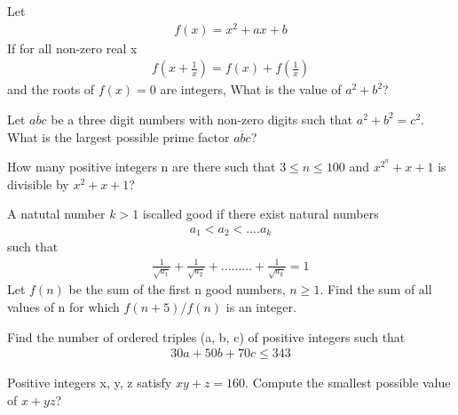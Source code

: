 \item Let
\begin{align*}
f(x) = x^2 + ax + b
\end{align*}
If for all non-zero real x
\begin{align*}
f\left(x + \frac{1}{x}\right) = f(x) + f\left(\frac{1}{x}\right)
\end{align*}
and the roots of $f(x) = 0$ are integers, What is the value of $a^2 + b^2$?

\item Let $\overline{abc}$ be a three digit numbers with non-zero digits such that $a^2 + b^2 = c^2$. What is the largest possible prime factor $\overline{abc}$?

\item How many positive integers n are there such that $3 \leq n \leq 100$ and $x^{2^{n}} + x + 1$ is divisible by 
$x^2 + x + 1$?

\item A natutal number $k > 1$ iscalled good if there exist natural numbers
\begin{align*}
a_1 < a_2 < ....a_k
\end{align*}
such that
\begin{align*}
\frac{1}{\sqrt{a_1}} + \frac{1}{\sqrt{a_2}} + ......... + \frac{1}{\sqrt{a_k}} = 1
\end{align*}
Let $f(n)$ be the sum of the first n good numbers, $n \geq 1$. Find the sum of all values of n for which $f(n + 5)/f(n)$ is an integer.

\item Find the number of ordered triples (a, b, c) of positive integers such that
\begin{align*}
30a + 50b + 70c \leq 343
\end{align*}

\item Positive integers x, y, z satisfy $xy + z = 160$. Compute the smallest possible value of $x + yz$?